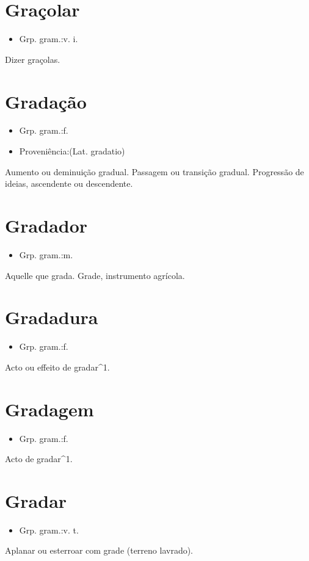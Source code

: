\section{Graçolar}
\begin{itemize}
\item {Grp. gram.:v. i.}
\end{itemize}
Dizer graçolas.
\section{Gradação}
\begin{itemize}
\item {Grp. gram.:f.}
\end{itemize}
\begin{itemize}
\item {Proveniência:(Lat. \textunderscore gradatio\textunderscore )}
\end{itemize}
Aumento ou deminuição gradual.
Passagem ou transição gradual.
Progressão de ideias, ascendente ou descendente.
\section{Gradador}
\begin{itemize}
\item {Grp. gram.:m.}
\end{itemize}
Aquelle que grada.
Grade, instrumento agrícola.
\section{Gradadura}
\begin{itemize}
\item {Grp. gram.:f.}
\end{itemize}
Acto ou effeito de gradar^1.
\section{Gradagem}
\begin{itemize}
\item {Grp. gram.:f.}
\end{itemize}
Acto de gradar^1.
\section{Gradar}
\begin{itemize}
\item {Grp. gram.:v. t.}
\end{itemize}
Aplanar ou esterroar com grade (terreno lavrado).
